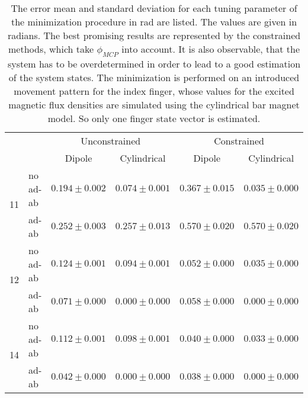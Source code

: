 \begin{table}[h]
\centering
\begin{tabular}{l l c c c c}
\toprule
 & &          				\multicolumn{2}{c}{Unconstrained}          &		\multicolumn{2}{c}{Constrained}\\ \cmidrule(lr){3-4}\cmidrule(lr){5-6}
 & & 								Dipole   			   & Cylindrical 	 			 & 		Dipole 			& 		Cylindrical \\ \midrule[2pt]
\multirow{2}{*}{11} & no ad-ab    & $ 0.194 \pm 0.002 $ & $ 0.074 \pm 0.001 $ & $ 0.367 \pm 0.015 $ & $ 0.035 \pm 0.000 $ \\ 
					& ad-ab		 & $ 0.252 \pm 0.003 $ & $ 0.257 \pm 0.013 $ & $ 0.570 \pm 0.020 $ & $ 0.570 \pm 0.020 $ \\ \midrule
\multirow{2}{*}{12} & no ad-ab    & $ 0.124 \pm 0.001 $ & $ 0.094 \pm 0.001 $ & $ 0.052 \pm 0.000 $ & $ 0.035 \pm 0.000 $ \\ 
					& ad-ab		 & $ 0.071 \pm 0.000 $ & $ 0.000 \pm 0.000 $ & $ 0.058 \pm 0.000 $ & $ 0.000 \pm 0.000 $\\ \midrule
\multirow{2}{*}{14} & no ad-ab    & $ 0.112 \pm 0.001 $ & $ 0.098 \pm 0.001 $ & $ 0.040 \pm 0.000 $ & $ 0.033 \pm 0.000 $ \\ 
					& ad-ab		 & $ 0.042 \pm 0.000 $ & $ 0.000 \pm 0.000 $ & $ 0.038 \pm 0.000 $ & $ 0.000 \pm 0.000 $\\										
\bottomrule
\end{tabular}
\caption[Quality of the minimization method for estimating one finger]
{The error mean and standard deviation for each tuning parameter of the minimization procedure in \si{\radian} are listed. The values are given in radians. The best promising results are represented by the constrained methods, which take $ \phi_{MCP} $ into account. It is also observable, that the system has to be overdetermined in order to lead to a good estimation of the system states. The minimization is performed on an introduced movement pattern for the index finger, whose values for the excited magnetic flux densities are simulated using the cylindrical bar magnet model. So only one finger state vector is estimated.}
\label{tab:oneFing}
\end{table}
